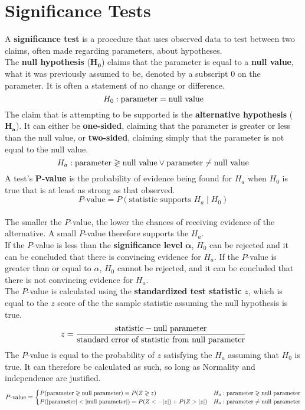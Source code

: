\documentclass[../AP_Statistics.tex]{subfiles}
\begin{document}
	\chapter{Significance Tests}
		A \textbf{significance test} is a procedure that uses observed data to test between two claims, often made regarding parameters, about hypotheses. \\
		The \textbf{null hypothesis} ($\pmb{H_0}$) claims that the parameter is equal to a \textbf{null value}, what it was previously assumed to be, denoted by a subscript $0$ on the parameter. It is often a statement of no change or difference.
		\[H_0:\rm{parameter} = \text{null value}\]
		The claim that is attempting to be supported is the \textbf{alternative hypothesis} ($\pmb{H_a}$). It can either be \textbf{one-sided}, claiming that the parameter is greater or less than the null value, or \textbf{two-sided}, claiming simply that the parameter is not equal to the null value.
		\[H_a:\rm{parameter} \gtrless \text{null value} \lor \rm{parameter} \ne \text{null value}\]
		A test's $\pmb{P}$\textbf{-value} is the probability of evidence being found for $H_a$ when $H_0$ is true that is at least as strong as that observed.
		\[P\text{-value} = P(\text{statistic supports } H_a \mid H_0)\] \\
		The smaller the $P$-value, the lower the chances of receiving evidence of the alternative. A small $P$-value therefore supports the $H_a$. \\
		If the $P$-value is less than the \textbf{significance level} $\pmb{\alpha}$, $H_0$ can be rejected and it can be concluded that there is convincing evidence for $H_a$. If the $P$-value is greater than or equal to $\alpha$, $H_0$ cannot be rejected, and it can be concluded that there is not convincing evidence for $H_a$. \\
		The $P$-value is calculated using the \textbf{standardized test statistic} $z$, which is equal to the $z$ score of the the sample statistic assuming the null hypothesis is true.
		\[z = \frac{\text{statistic} - \text{null parameter}}{\text{standard error of statistic from null parameter}}\]
		The $P$-value is equal to the probability of $z$ satisfying the $H_a$ assuming that $H_0$ is true. It can therefore be calculated as such, so long as Normality and independence are justified.
		\[\small
			P\text{-value} = \begin{cases}
				P(\text{parameter} \gtrless \text{null parameter}) = P(Z \gtrless z) & H_a:\text{parameter} \gtrless \text{null parameter} \\
				P(|\text{parameter}| < |\text{null parameter}|) = P(Z < -|z|) + P(Z > |z|) & H_a:\text{parameter} \ne \text{null parameter}
			\end{cases}
		\]
\end{document}
